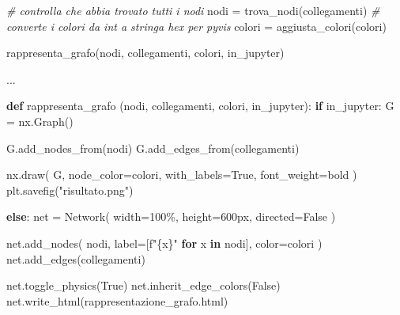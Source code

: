 \documentclass[11pt]{article}
\newenvironment{Shaded}{}{}
\newcommand{\KeywordTok}[1]{\textcolor[rgb]{0.00,0.44,0.13}{\textbf{{#1}}}}
\newcommand{\StringTok}[1]{\textcolor[rgb]{0.25,0.44,0.63}{{#1}}}
\newcommand{\CommentTok}[1]{\textcolor[rgb]{0.38,0.63,0.69}{\textit{{#1}}}}
\newcommand{\NormalTok}[1]{{#1}}
\newcommand{\SpecialCharTok}[1]{\textcolor[rgb]{0.25,0.44,0.63}{{#1}}}
\newcommand{\SpecialStringTok}[1]{\textcolor[rgb]{0.73,0.40,0.53}{{#1}}}
\newcommand{\VariableTok}[1]{\textcolor[rgb]{0.10,0.09,0.49}{{#1}}}
\newcommand{\ControlFlowTok}[1]{\textcolor[rgb]{0.00,0.44,0.13}{\textbf{{#1}}}}
\newcommand{\OperatorTok}[1]{\textcolor[rgb]{0.40,0.40,0.40}{{#1}}}
\begin{document}
\begin{Shaded}
\begin{Highlighting}[]
    \CommentTok{\# controlla che abbia trovato tutti i nodi}
\NormalTok{    nodi }\OperatorTok{=}\NormalTok{ trova\_nodi(collegamenti)}
    \CommentTok{\# converte i colori da int a stringa hex per pyvis}
\NormalTok{    colori }\OperatorTok{=}\NormalTok{ aggiusta\_colori(colori) }

\NormalTok{    rappresenta\_grafo(nodi, collegamenti, colori, in\_jupyter)  }

\NormalTok{...}


\KeywordTok{def}\NormalTok{ rappresenta\_grafo (nodi, collegamenti, colori, in\_jupyter):}
    \ControlFlowTok{if}\NormalTok{ in\_jupyter:}
\NormalTok{        G }\OperatorTok{=}\NormalTok{ nx.Graph()}

\NormalTok{        G.add\_nodes\_from(nodi)}
\NormalTok{        G.add\_edges\_from(collegamenti)}

\NormalTok{        nx.draw(}
\NormalTok{            G, }
\NormalTok{            node\_color}\OperatorTok{=}\NormalTok{colori, }
\NormalTok{            with\_labels}\OperatorTok{=}\VariableTok{True}\NormalTok{, }
\NormalTok{            font\_weight}\OperatorTok{=}\StringTok{\textquotesingle{}bold\textquotesingle{}}
\NormalTok{        )}
\NormalTok{        plt.savefig(}\StringTok{"risultato.png"}\NormalTok{)}

    \ControlFlowTok{else}\NormalTok{:}
\NormalTok{        net }\OperatorTok{=}\NormalTok{ Network(}
\NormalTok{            width}\OperatorTok{=}\StringTok{\textquotesingle{}100\%\textquotesingle{}}\NormalTok{, }
\NormalTok{            height}\OperatorTok{=}\StringTok{\textquotesingle{}600px\textquotesingle{}}\NormalTok{, }
\NormalTok{            directed}\OperatorTok{=}\VariableTok{False}
\NormalTok{        )}

\NormalTok{        net.add\_nodes(}
\NormalTok{            nodi, }
\NormalTok{            label}\OperatorTok{=}\NormalTok{[}\SpecialStringTok{f"}\SpecialCharTok{\{x\}}\SpecialStringTok{"} \ControlFlowTok{for}\NormalTok{ x }\KeywordTok{in}\NormalTok{ nodi], }
\NormalTok{            color}\OperatorTok{=}\NormalTok{colori}
\NormalTok{        )}
\NormalTok{        net.add\_edges(collegamenti)}

\NormalTok{        net.toggle\_physics(}\VariableTok{True}\NormalTok{)}
\NormalTok{        net.inherit\_edge\_colors(}\VariableTok{False}\NormalTok{)}
\NormalTok{        net.write\_html(}\StringTok{\textquotesingle{}rappresentazione\_grafo.html\textquotesingle{}}\NormalTok{)}
\end{Highlighting}
\end{Shaded}
\end{document}
